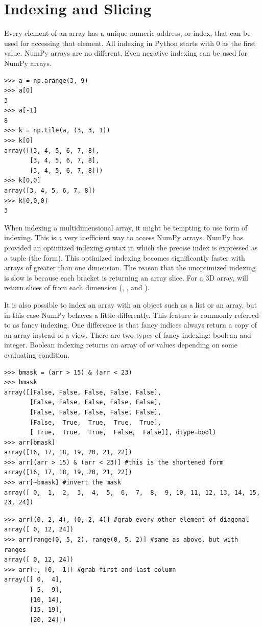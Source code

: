 \section*{Indexing and Slicing}
Every element of an array has a unique numeric address, or index, that can be used for accessing that element.
All indexing in Python starts with 0 as the first value.  
NumPy arrays are no different.  Even negative indexing can be used for NumPy arrays.
\begin{lstlisting}
>>> a = np.arange(3, 9)
>>> a[0]
3
>>> a[-1]
8
>>> k = np.tile(a, (3, 3, 1))
>>> k[0]
array([[3, 4, 5, 6, 7, 8],
       [3, 4, 5, 6, 7, 8],
       [3, 4, 5, 6, 7, 8]])
>>> k[0,0]
array([3, 4, 5, 6, 7, 8])
>>> k[0,0,0]
3
\end{lstlisting}
When indexing a multidimensional array, it might be tempting to use  form of indexing.  
This is a very inefficient way to access NumPy arrays.
NumPy has provided an optimized indexing syntax in which the precise index is expressed as a tuple (the  form).  This optimized indexing becomes significantly faster with arrays of greater than one dimension.
The reason that the unoptimized indexing is slow is because each bracket is returning an array slice.  
For a 3D array,  will return slices of  from each dimension (, , and ).

It is also possible to index an array with an object such as a list or an array, but in this case NumPy behaves a little differently.
This feature is commonly referred to as fancy indexing.
One difference is that fancy indices always return a copy of an array instead of a view.
There are two types of fancy indexing: boolean and integer.
Boolean indexing returns an array of  or  values depending on some 
evaluating condition.
\begin{lstlisting}
>>> bmask = (arr > 15) & (arr < 23)
>>> bmask
array([[False, False, False, False, False],
       [False, False, False, False, False],
       [False, False, False, False, False],
       [False,  True,  True,  True,  True],
       [ True,  True,  True,  False,  False]], dtype=bool)
>>> arr[bmask]
array([16, 17, 18, 19, 20, 21, 22])
>>> arr[(arr > 15) & (arr < 23)] #this is the shortened form
array([16, 17, 18, 19, 20, 21, 22])
>>> arr[~bmask] #invert the mask
array([ 0,  1,  2,  3,  4,  5,  6,  7,  8,  9, 10, 11, 12, 13, 14, 15, 23, 24])
\end{lstlisting}
\begin{lstlisting}
>>> arr[(0, 2, 4), (0, 2, 4)] #grab every other element of diagonal
array([ 0, 12, 24])
>>> arr[range(0, 5, 2), range(0, 5, 2)] #same as above, but with ranges
array([ 0, 12, 24])
>>> arr[:, [0, -1]] #grab first and last column
array([[ 0,  4],
       [ 5,  9],
       [10, 14],
       [15, 19],
       [20, 24]])
\end{lstlisting}

